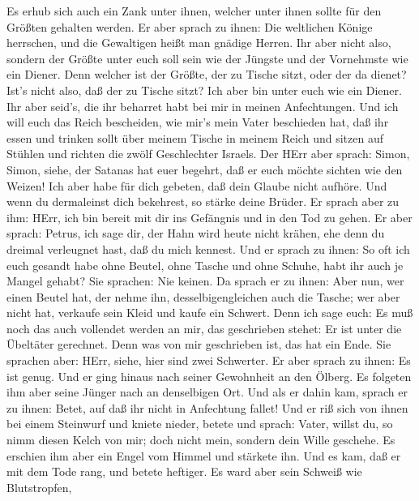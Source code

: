  Es erhub sich auch ein Zank unter ihnen, welcher unter
ihnen sollte für den Größten gehalten werden.  Er aber
sprach zu ihnen: Die weltlichen Könige herrschen, und die Gewaltigen
heißt man gnädige Herren.  Ihr aber nicht also, sondern der
Größte unter euch soll sein wie der Jüngste und der Vornehmste wie ein
Diener.  Denn welcher ist der Größte, der zu Tische sitzt,
oder der da dienet? Ist's nicht also, daß der zu Tische sitzt? Ich aber
bin unter euch wie ein Diener.  Ihr aber seid's, die ihr
beharret habt bei mir in meinen Anfechtungen.  Und ich will
euch das Reich bescheiden, wie mir's mein Vater beschieden hat,
 daß ihr essen und trinken sollt über meinem Tische in
meinem Reich und sitzen auf Stühlen und richten die zwölf Geschlechter
Israels.  Der HErr aber sprach: Simon, Simon, siehe, der
Satanas hat euer begehrt, daß er euch möchte sichten wie den Weizen!
 Ich aber habe für dich gebeten, daß dein Glaube nicht
aufhöre. Und wenn du dermaleinst dich bekehrest, so stärke deine Brüder.
 Er sprach aber zu ihm: HErr, ich bin bereit mit dir ins
Gefängnis und in den Tod zu gehen.  Er aber sprach: Petrus,
ich sage dir, der Hahn wird heute nicht krähen, ehe denn du dreimal
verleugnet hast, daß du mich kennest.  Und er sprach zu
ihnen: So oft ich euch gesandt habe ohne Beutel, ohne Tasche und ohne
Schuhe, habt ihr auch je Mangel gehabt? Sie sprachen: Nie keinen.
 Da sprach er zu ihnen: Aber nun, wer einen Beutel hat, der
nehme ihn, desselbigengleichen auch die Tasche; wer aber nicht hat,
verkaufe sein Kleid und kaufe ein Schwert.  Denn ich sage
euch: Es muß noch das auch vollendet werden an mir, das geschrieben
stehet: Er ist unter die Übeltäter gerechnet. Denn was von mir
geschrieben ist, das hat ein Ende.  Sie sprachen aber:
HErr, siehe, hier sind zwei Schwerter. Er aber sprach zu ihnen: Es ist
genug.  Und er ging hinaus nach seiner Gewohnheit an den
Ölberg. Es folgeten ihm aber seine Jünger nach an denselbigen Ort.
 Und als er dahin kam, sprach er zu ihnen: Betet, auf daß
ihr nicht in Anfechtung fallet!  Und er riß sich von ihnen
bei einem Steinwurf und kniete nieder, betete  und sprach:
Vater, willst du, so nimm diesen Kelch von mir; doch nicht mein, sondern
dein Wille geschehe.  Es erschien ihm aber ein Engel vom
Himmel und stärkete ihn.  Und es kam, daß er mit dem Tode
rang, und betete heftiger. Es ward aber sein Schweiß wie Blutstropfen,
